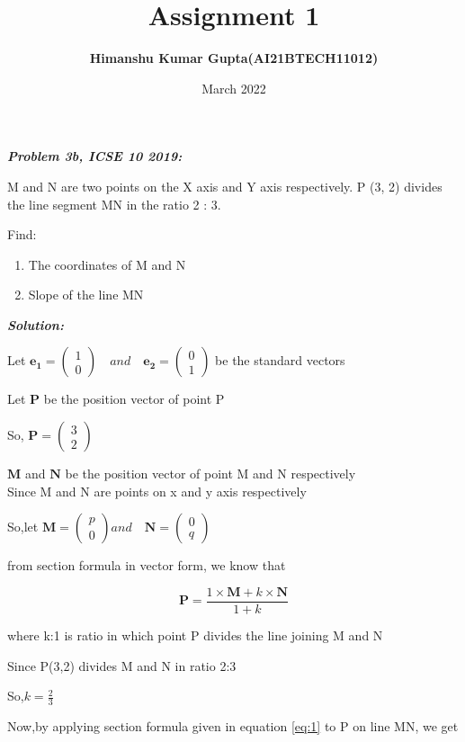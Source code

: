 \documentclass[journal,12pt,twocolumn]{IEEEtran}
\begin{document}
\newcommand{\myvec}[1]{\ensuremath{\begin{pmatrix}#1\end{pmatrix}}}

\let\vec\mathbf


\title{Assignment 1}
\author{\textbf{Himanshu Kumar Gupta(AI21BTECH11012)}}
\maketitle
\date {March 2022}


\textbf{\textit{Problem 3b, ICSE 10 2019:}}


 M and N are two points on the X axis and Y axis respectively. 
P (3, 2) divides the line segment MN in the ratio 2 : 3.

Find:
\begin{enumerate}
    \item The coordinates of M and N
    \item Slope of the line MN
\end{enumerate}

\textbf{\textit{Solution:}}

Let $\vec{e_1}=\myvec{1\\0} \quad and \quad \vec{e_2}=\myvec{0\\1}$ be the standard vectors

 Let $\vec{P}$ be the position vector of point P
 
  So, $\vec{P}=\myvec{3 \\ 2}$
  
 $\vec{M}$ and $\vec{N}$ be the position vector of point M and N respectively\\
Since M and N are points on x and y axis respectively

  So,let $\vec{M}=\myvec{p\\0} and\quad \vec{N}=\myvec{0\\q}$
  
  from section formula in vector form, we know that
  
  \begin{equation}
  \label{eq:1}
\vec{P}=\frac{1\times \vec{M} +k\times \vec{N}}{1+k}     
  \end{equation}
 
  where k:1 is ratio in which point P divides the line joining M and N
  
Since P(3,2) divides M and N in ratio 2:3

So,$ k=\frac{2}{3}$

Now,by applying section formula given in equation \eqref{eq:1} to P on line MN, we get
\end{document}
